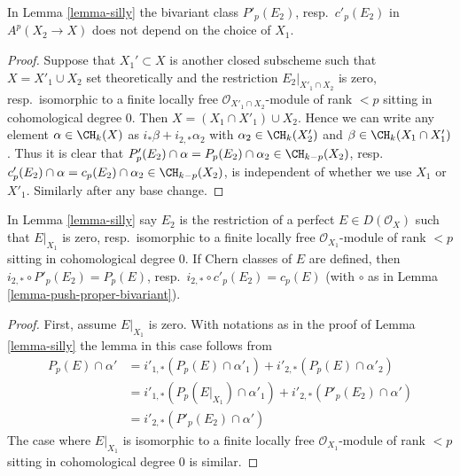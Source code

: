\begin{lemma}
\label{lemma-silly-independent}
In Lemma \ref{lemma-silly} the bivariant class
$P'_p(E_2)$, resp.\ $c'_p(E_2)$ in $A^p(X_2 \to X)$
does not depend on the choice of $X_1$.
\end{lemma}

\begin{proof}
Suppose that $X_1' \subset X$ is another closed subscheme such that
$X = X'_1 \cup X_2$ set theoretically and the restriction
$E_2|_{X'_1 \cap X_2}$ is zero, resp.\ isomorphic to a
finite locally free $\mathcal{O}_{X'_1 \cap X_2}$-module
of rank $< p$ sitting in cohomological degree $0$.
Then $X = (X_1 \cap X'_1) \cup X_2$. Hence we can write
any element $\alpha \in \CH_k(X)$ as $i_*\beta + i_{2, *}\alpha_2$ with
$\alpha_2 \in \CH_k(X'_2)$ and $\beta \in \CH_k(X_1 \cap X'_1)$.
Thus it is clear that
$P'_p(E_2) \cap \alpha = P_p(E_2) \cap \alpha_2 \in \CH_{k - p}(X_2)$,
resp.\  $c'_p(E_2) \cap \alpha = c_p(E_2) \cap \alpha_2 \in \CH_{k - p}(X_2)$,
is independent of whether we use $X_1$ or $X'_1$. Similarly
after any base change.
\end{proof}

\begin{lemma}
\label{lemma-silly-silly}
In Lemma \ref{lemma-silly} say $E_2$ is the restriction of a
perfect $E \in D(\mathcal{O}_X)$ such that $E|_{X_1}$ is zero,
resp.\ isomorphic to a finite locally free $\mathcal{O}_{X_1}$-module
of rank $< p$ sitting in cohomological degree $0$.
If Chern classes of $E$ are defined, then
$i_{2, *} \circ P'_p(E_2) = P_p(E)$,
resp.\ $i_{2, *} \circ c'_p(E_2) = c_p(E)$
(with $\circ$ as in Lemma \ref{lemma-push-proper-bivariant}).
\end{lemma}

\begin{proof}
First, assume $E|_{X_1}$ is zero.
With notations as in the proof of Lemma \ref{lemma-silly}
the lemma in this case follows from
\begin{align*}
P_p(E) \cap \alpha'
& =
i'_{1, *}(P_p(E) \cap \alpha'_1) +
i'_{2, *}(P_p(E) \cap \alpha'_2) \\
& =
i'_{1, *}(P_p(E|_{X_1}) \cap \alpha'_1) +
i'_{2, *}(P'_p(E_2) \cap \alpha') \\
& =
i'_{2, *}(P'_p(E_2) \cap \alpha')
\end{align*}
The case where $E|_{X_1}$ is isomorphic to a finite locally free
$\mathcal{O}_{X_1}$-module of rank $< p$ sitting in cohomological degree $0$
is similar.
\end{proof}

